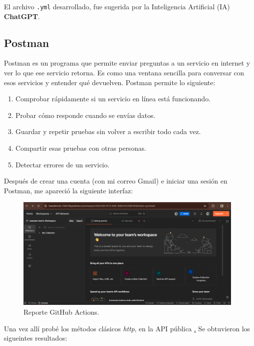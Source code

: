 \documentclass[12pt,a4paper]{article}
\begin{document}
El archivo \texttt{.yml} desarrollado, fue sugerida por la Inteligencia Artificial (IA) \textbf{ChatGPT}.

\subsection{Postman}
Postman es un programa que permite enviar preguntas a un servicio en internet y ver lo que ese servicio retorna. 
Es como una ventana sencilla para conversar con esos servicios y entender qué devuelven. Postman permite lo siguiente:

\begin{enumerate}
  \item Comprobar rápidamente si un servicio en línea está funcionando.
  \item Probar cómo responde cuando se envías datos.
  \item Guardar y repetir pruebas sin volver a escribir todo cada vez.
  \item Compartir esas pruebas con otras personas.
  \item Detectar errores de un servicio.
\end{enumerate}

Después de crear una cuenta (con mi correo Gmail) e iniciar una sesión en Postman, me apareció la siguiente interfaz:

\begin{figure}[H]
  \centering
  \includegraphics[width=\textwidth]{postman.png}
  \caption{Reporte GitHub Actions.}
  \label{fig:postman}
\end{figure}

Una vez allí probé los métodos clásicos \textit{http}, en la API pública \href{https://jsonplaceholder.typicode.com}. 
Se obtuvieron los sigueintes resultados:
\end{document}
